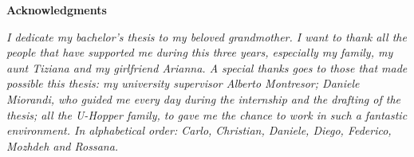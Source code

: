 \thispagestyle{empty}

\begin{center}
  {\bf \Huge Acknowledgments}
\end{center}

\vspace{4cm}


\emph{
I dedicate my bachelor's thesis to my beloved grandmother. I want to thank all the people that have supported me during this three years, especially my family, my aunt Tiziana and my girlfriend Arianna. A special thanks goes to those that made possible this thesis: my university supervisor Alberto Montresor; Daniele Miorandi, who guided me every day during the internship and the drafting of the thesis; all the U-Hopper family, to gave me the chance to work in such a fantastic environment. In alphabetical order: Carlo, Christian, Daniele, Diego, Federico, Mozhdeh and Rossana.
}
